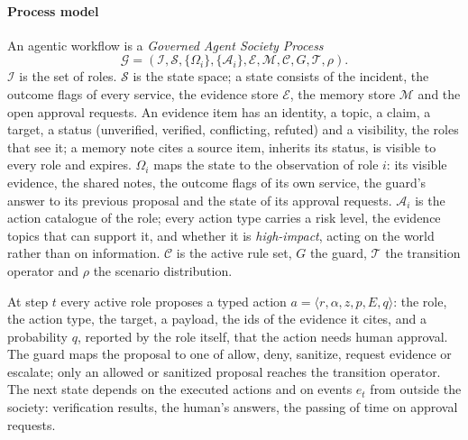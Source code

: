 \documentclass[10pt,conference]{IEEEtran}
\begin{document}
\paragraph{Process model}
An agentic workflow is a \emph{Governed Agent Society Process}
\[
\mathcal{G} = (\mathcal{I}, \mathcal{S}, \{\Omega_i\}, \{\mathcal{A}_i\}, \mathcal{E}, \mathcal{M}, \mathcal{C}, G, \mathcal{T}, \rho).
\]
$\mathcal{I}$ is the set of roles. $\mathcal{S}$ is the state space; a state consists of the incident, the outcome flags of every service, the evidence store $\mathcal{E}$, the memory store $\mathcal{M}$ and the open approval requests. An evidence item has an identity, a topic, a claim, a target, a status (unverified, verified, conflicting, refuted) and a visibility, the roles that see it; a memory note cites a source item, inherits its status, is visible to every role and expires. $\Omega_i$ maps the state to the observation of role $i$: its visible evidence, the shared notes, the outcome flags of its own service, the guard's answer to its previous proposal and the state of its approval requests. $\mathcal{A}_i$ is the action catalogue of the role; every action type carries a risk level, the evidence topics that can support it, and whether it is \emph{high-impact}, acting on the world rather than on information. $\mathcal{C}$ is the active rule set, $G$ the guard, $\mathcal{T}$ the transition operator and $\rho$ the scenario distribution.

At step $t$ every active role proposes a typed action $a = \langle r, \alpha, z, p, E, q\rangle$: the role, the action type, the target, a payload, the ids of the evidence it cites, and a probability $q$, reported by the role itself, that the action needs human approval. The guard maps the proposal to one of allow, deny, sanitize, request evidence or escalate; only an allowed or sanitized proposal reaches the transition operator. The next state depends on the executed actions and on events $e_t$ from outside the society: verification results, the human's answers, the passing of time on approval requests.
\end{document}
